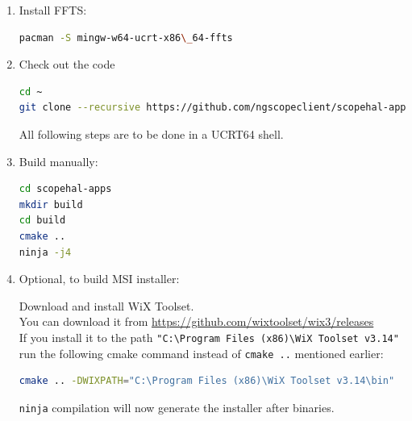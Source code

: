 \begin{enumerate}
\item Install FFTS:
\begin{lstlisting}[language=sh, numbers=none]
pacman -S mingw-w64-ucrt-x86\_64-ffts
\end{lstlisting}

\item Check out the code

\begin{lstlisting}[language=sh, numbers=none]
cd ~
git clone --recursive https://github.com/ngscopeclient/scopehal-apps
\end{lstlisting}

All following steps are to be done in a UCRT64 shell.

\item Build manually:
\begin{lstlisting}[language=sh, numbers=none]
cd scopehal-apps
mkdir build
cd build
cmake ..
ninja -j4
\end{lstlisting}

\item Optional, to build MSI installer:

Download and install WiX Toolset.\\
You can download it from \href{https://github.com/wixtoolset/wix3/releases}{https://github.com/wixtoolset/wix3/releases}\\
If you install it to the path \texttt{"C:\textbackslash Program Files (x86)\textbackslash WiX Toolset v3.14"} run the following cmake command instead of \texttt{cmake ..} mentioned earlier:

\begin{lstlisting}[language=sh, numbers=none]
cmake .. -DWIXPATH="C:\Program Files (x86)\WiX Toolset v3.14\bin"
\end{lstlisting}

\texttt{ninja} compilation will now generate the installer after binaries.







\end{enumerate}
